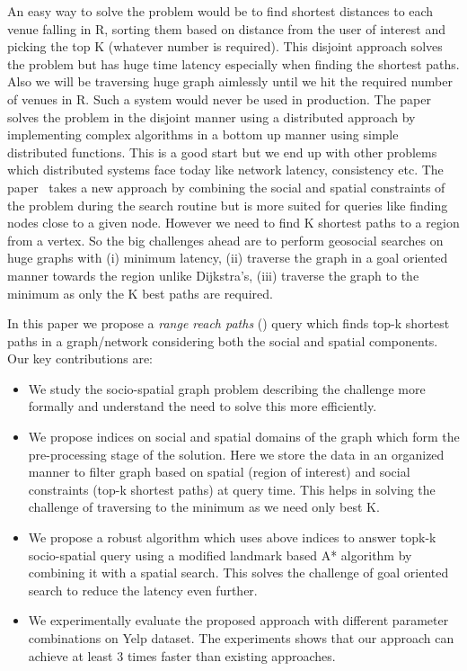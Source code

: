 An easy way to solve the problem would be to find shortest distances to each venue falling in R, sorting them based on distance from the user of interest and picking the top K (whatever number is required). This disjoint approach solves the problem but has huge time latency especially when finding the shortest paths. Also we will be traversing huge graph aimlessly until we hit the required number of venues in R. Such a system would never be used in production. The paper~\cite{NSD2013} solves the problem in the disjoint manner using a distributed approach by implementing complex algorithms in a bottom up manner using simple distributed functions. This is a good start but we end up with other problems which distributed systems face today like network latency, consistency etc. The paper~\cite{KJY+2015} takes a new approach by combining the social and spatial constraints of the problem during the search routine but is more suited for queries like finding nodes close to a given node. However we need to find K shortest paths to a region from a vertex. So the big challenges ahead are to perform geosocial searches on huge graphs with (i) minimum latency, (ii) traverse the graph in a goal oriented manner towards the region unlike Dijkstra's, (iii) traverse the graph to the minimum as only the K best paths are required.

In this paper we propose a \textit{range reach paths} ({\rrp}) query which finds top-k shortest paths in a graph/network considering both the social and spatial components. Our key contributions are:
\begin{itemize}
	\item We study the socio-spatial graph problem describing the challenge more formally and understand the need to solve this more efficiently.
	\item We propose indices on social and spatial domains of the graph which form the pre-processing stage of the solution. Here we store the data in an organized manner to filter graph based on spatial (region of interest) and social constraints (top-k shortest paths) at query time. This helps in solving the challenge of traversing to the minimum as we need only best K.
	\item We propose a robust algorithm which uses above indices to answer topk-k socio-spatial query using a modified landmark based A* algorithm by combining it with a spatial search. This solves the challenge of goal oriented search to reduce the latency even further.
	\item We experimentally evaluate the proposed approach with different parameter combinations on Yelp dataset. The experiments shows that our approach can achieve at least 3 times faster than existing approaches.
\end{itemize}

